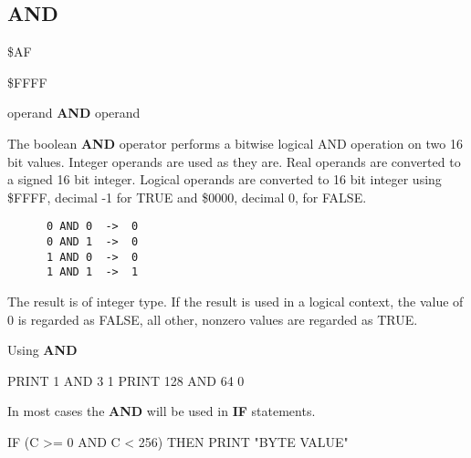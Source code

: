 \subsection{AND}
\begin{description}[leftmargin=3cm,style=nextline]
\item [Token:] \$AF
\item [Address:] \$FFFF
\item [Format:] operand {\bf AND} operand
\item [Usage:]  The boolean {\bf AND} operator performs a bitwise
                logical AND operation on two 16 bit values.
                Integer operands are used as they are.
                Real operands are converted to a signed 16 bit integer.
                Logical operands are converted to 16 bit integer
                using \$FFFF, decimal -1 for TRUE
                and \$0000, decimal 0, for FALSE.

   \begin{verbatim}
      0 AND 0  ->  0
      0 AND 1  ->  0
      1 AND 0  ->  0
      1 AND 1  ->  1
   \end{verbatim}

\item [Remarks:] The result is of integer type.
                 If the result is used in a logical context,
                 the value of 0 is regarded as FALSE,
                 all other, nonzero values are regarded as TRUE.
\item [Example:] Using {\bf AND} \\

\begin{screenoutput}
  PRINT 1 AND 3
  1
  PRINT 128 AND 64
  0
\end{screenoutput}

In most cases the {\bf AND} will be used in {\bf IF} statements.

\begin{screenoutput}
   IF (C >= 0 AND C < 256) THEN PRINT "BYTE VALUE"
\end{screenoutput}
\end{description}


\newpage
